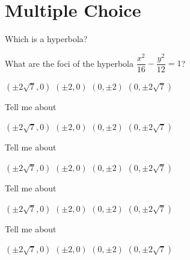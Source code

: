 \documentclass{exam}
\begin{document}
\section*{Multiple Choice}
\begin{questions}
\question Which is a hyperbola?

\begin{oneparchoices}
	\choice {}
	\choice {}
	\choice {}
	\choice {}
\end{oneparchoices} \answerline

\question What are the foci of the hyperbola $\dfrac{x^2}{16}-\dfrac{y^2}{12} = 1$?

\begin{oneparchoices}
	\choice $(\pm 2\sqrt7,0)$
	\choice $(\pm 2,0)$
	\choice $(0, \pm 2)$
	\choice $(0, \pm 2\sqrt7)$
\end{oneparchoices} \answerline

\question  Tell me about 

\begin{oneparchoices}
	\choice $(\pm 2\sqrt7,0)$
	\choice $(\pm 2,0)$
	\choice $(0, \pm 2)$
	\choice $(0, \pm 2\sqrt7)$
\end{oneparchoices} \answerline

\question  Tell me about 

\begin{oneparchoices}
	\choice $(\pm 2\sqrt7,0)$
	\choice $(\pm 2,0)$
	\choice $(0, \pm 2)$
	\choice $(0, \pm 2\sqrt7)$
\end{oneparchoices} \answerline

\question Tell me about 

\begin{oneparchoices}
	\choice $(\pm 2\sqrt7,0)$
	\choice $(\pm 2,0)$
	\choice $(0, \pm 2)$
	\choice $(0, \pm 2\sqrt7)$
\end{oneparchoices} \answerline

\question  Tell me about 

\begin{oneparchoices}
	\choice $(\pm 2\sqrt7,0)$
	\choice $(\pm 2,0)$
	\choice $(0, \pm 2)$
	\choice $(0, \pm 2\sqrt7)$
\end{oneparchoices} \answerline
\end{questions}
\end{document}
